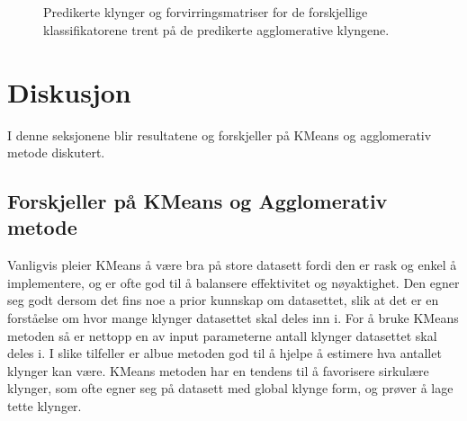 \documentclass[twocolumn,norwegian]{article}
\begin{document}
	\begin{figure*}[h!]
		\vspace{-0.83cm}
		\centering
					
		\\
		\\
		\caption{Predikerte klynger og forvirringsmatriser for de forskjellige klassifikatorene trent på de predikerte agglomerative klyngene.}
		\label{fig:Agglo_klynger}
	\end{figure*}
		
	
	\section{Diskusjon}
	I denne seksjonene blir resultatene og forskjeller på KMeans og agglomerativ metode diskutert.
	
	
	\subsection{Forskjeller på KMeans og Agglomerativ metode}
	Vanligvis pleier KMeans å være bra på store datasett fordi den er rask og enkel å implementere, og er ofte god til å balansere effektivitet og nøyaktighet. Den egner seg godt dersom det fins noe a prior kunnskap om datasettet, slik at det er en forståelse om hvor mange klynger datasettet skal deles inn i. For å bruke KMeans metoden så er nettopp en av input parameterne antall klynger datasettet skal deles i. I slike tilfeller er albue metoden god til å hjelpe å estimere hva antallet klynger kan være. KMeans metoden har en tendens til å favorisere sirkulære klynger, som ofte egner seg på datasett med global klynge form, og prøver å lage tette klynger.
	
\end{document}
